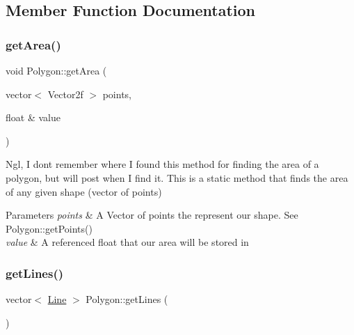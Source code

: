 \begin{DoxyItemize}
\item 
\end{DoxyItemize}

\subsection{Member Function Documentation}
\mbox{\label{class_polygon_a21a607cdb559f8e4a98fa54d0b9d63a9}} 
\subsubsection{\texorpdfstring{getArea()}{getArea()}}
{\footnotesize\ttfamily void Polygon\+::get\+Area (\begin{DoxyParamCaption}\item[{vector$<$ Vector2f $>$}]{points,  }\item[{float \&}]{value }\end{DoxyParamCaption})\hspace{0.3cm}{\ttfamily [static]}}



Ngl, I don\textquotesingle{}t remember where I found this method for finding the area of a polygon, but will post when I find it. This is a static method that finds the area of any given shape (vector of points) 


\begin{DoxyParams}{Parameters}
{\em points} & A Vector of points the represent our shape. See Polygon\+::get\+Points() \\
\hline
{\em value} & A referenced float that our area will be stored in \\
\hline
\end{DoxyParams}
\mbox{\label{class_polygon_acbeaa5a9990ee704fdfa766d4a34b86c}} 
\subsubsection{\texorpdfstring{getLines()}{getLines()}}
{\footnotesize\ttfamily vector$<$ \mbox{\hyperlink{class_line}{Line}} $>$ Polygon\+::get\+Lines (\begin{DoxyParamCaption}{ }\end{DoxyParamCaption})}



